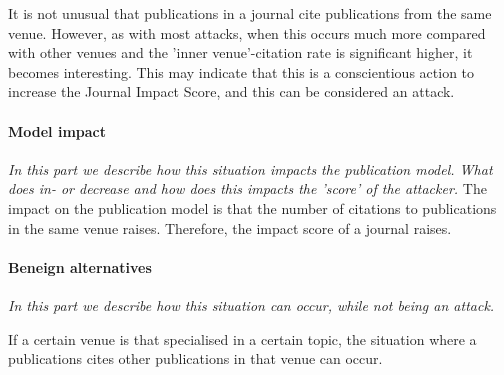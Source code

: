 \documentclass{ou-report}
\newcommand{\outline}[1]{{\color{blue} #1}}
\begin{document}
It is not unusual that 
publications in a journal cite publications from the same venue. However, as
with most attacks, when this occurs much more 
compared with other venues and the 'inner venue'-citation rate is significant higher, it becomes 
interesting. This may indicate that this is a conscientious action to increase
the Journal Impact Score, and this can be considered an attack.

\paragraph{Model impact}
\textit{In this part we describe how this situation impacts the publication 
model. What does in- or decrease and how does this impacts the 'score' 
of the attacker.}
The impact on the publication model is that the number of citations to 
publications in the same venue raises. Therefore, the impact score of a journal
raises. 

\paragraph{Beneign alternatives}
\textit{In this part we describe how this situation can occur, while not being
an attack.} 

If a certain venue is that specialised in a certain topic, the 
situation where a publications cites other publications in that venue can occur.







\end{document}
